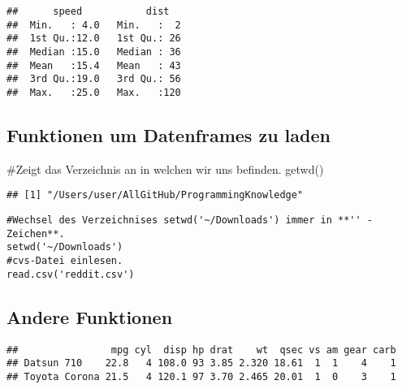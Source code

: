 \documentclass[]{article}
\newenvironment{Shaded}{\begin{snugshade}}{\end{snugshade}}
\newcommand{\KeywordTok}[1]{\textcolor[rgb]{0.94,0.87,0.69}{{#1}}}
\newcommand{\DecValTok}[1]{\textcolor[rgb]{0.86,0.86,0.80}{{#1}}}
\newcommand{\FloatTok}[1]{\textcolor[rgb]{0.75,0.75,0.82}{{#1}}}
\newcommand{\StringTok}[1]{\textcolor[rgb]{0.80,0.58,0.58}{{#1}}}
\newcommand{\CommentTok}[1]{\textcolor[rgb]{0.50,0.62,0.50}{{#1}}}
\newcommand{\NormalTok}[1]{\textcolor[rgb]{0.80,0.80,0.80}{{#1}}}
\begin{document}
\begin{verbatim}
##      speed           dist    
##  Min.   : 4.0   Min.   :  2  
##  1st Qu.:12.0   1st Qu.: 26  
##  Median :15.0   Median : 36  
##  Mean   :15.4   Mean   : 43  
##  3rd Qu.:19.0   3rd Qu.: 56  
##  Max.   :25.0   Max.   :120
\end{verbatim}

\subsection{Funktionen um Datenframes zu
laden}\label{funktionen-um-datenframes-zu-laden}

\begin{Shaded}
\begin{Highlighting}[]
\CommentTok{#Zeigt das Verzeichnis an in welchen wir uns befinden.}
\KeywordTok{getwd}\NormalTok{() }
\end{Highlighting}
\end{Shaded}

\begin{verbatim}
## [1] "/Users/user/AllGitHub/ProgrammingKnowledge"
\end{verbatim}

\begin{verbatim}
#Wechsel des Verzeichnises setwd('~/Downloads') immer in **'' - Zeichen**.
setwd('~/Downloads') 
#cvs-Datei einlesen.
read.csv('reddit.csv')
\end{verbatim}

\subsection{Andere Funktionen}\label{andere-funktionen}

\begin{Shaded}
\end{Shaded}

\begin{verbatim}
##                mpg cyl  disp hp drat    wt  qsec vs am gear carb
## Datsun 710    22.8   4 108.0 93 3.85 2.320 18.61  1  1    4    1
## Toyota Corona 21.5   4 120.1 97 3.70 2.465 20.01  1  0    3    1
\end{verbatim}
\end{document}
